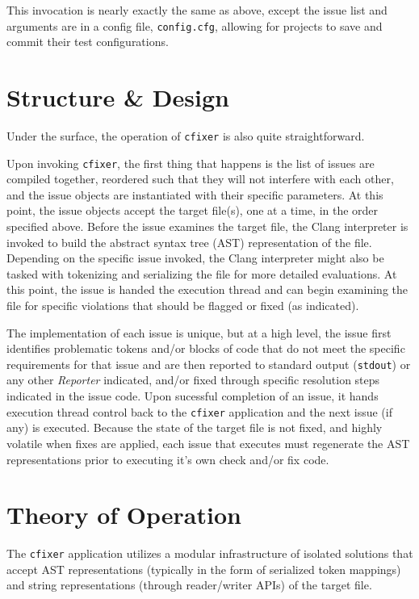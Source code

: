 \documentclass[11pt]{scrreprt}
\begin{document}
This invocation is nearly exactly the same as above, except the issue list and arguments are in a config file, \texttt{config.cfg}, allowing for projects to save and commit their test configurations.

\section{Structure \& Design}

Under the surface, the operation of \texttt{cfixer} is also quite straightforward.

Upon invoking \texttt{cfixer}, the first thing that happens is the list of issues are compiled together, reordered such that they will not interfere with each other, and the issue objects are instantiated with their specific parameters.
At this point, the issue objects accept the target file(s), one at a time, in the order specified above.
Before the issue examines the target file, the Clang interpreter is invoked to build the abstract syntax tree (AST) representation of the file.
Depending on the specific issue invoked, the Clang interpreter might also be tasked with tokenizing and serializing the file for more detailed evaluations.
At this point, the issue is handed the execution thread and can begin examining the file for specific violations that should be flagged or fixed (as indicated).

The implementation of each issue is unique, but at a high level, the issue first identifies problematic tokens and/or blocks of code that do not meet the specific requirements for that issue and are then reported to standard output (\texttt{stdout}) or any other \textit{Reporter} indicated, and/or fixed through specific resolution steps indicated in the issue code.
Upon sucessful completion of an issue, it hands execution thread control back to the \texttt{cfixer} application and the next issue (if any) is executed.
Because the state of the target file is not fixed, and highly volatile when fixes are applied, each issue that executes must regenerate the AST representations prior to executing it's own check and/or fix code.

\section{Theory of Operation}

The \texttt{cfixer} application utilizes a modular infrastructure of isolated solutions that accept AST representations (typically in the form of serialized token mappings) and string representations (through reader/writer APIs) of the target file.
\end{document}
